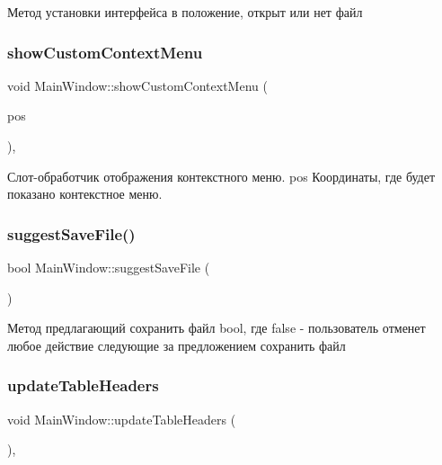 Метод установки интерфейса в положение, открыт или нет файл \mbox{\label{class_main_window_ac9b3f3c02dccbd067c7b614034ffc035}} 
\subsubsection{\texorpdfstring{showCustomContextMenu}{showCustomContextMenu}}
{\footnotesize\ttfamily void Main\+Window\+::show\+Custom\+Context\+Menu (\begin{DoxyParamCaption}\item[{const Q\+Point \&}]{pos }\end{DoxyParamCaption})\hspace{0.3cm}{\ttfamily [private]}, {\ttfamily [slot]}}

Слот-\/обработчик отображения контекстного меню. pos Координаты, где будет показано контекстное меню. \mbox{\label{class_main_window_a0a1b89e3dba62780bfdeea2e76ffc560}} 
\subsubsection{\texorpdfstring{suggestSaveFile()}{suggestSaveFile()}}
{\footnotesize\ttfamily bool Main\+Window\+::suggest\+Save\+File (\begin{DoxyParamCaption}{ }\end{DoxyParamCaption})\hspace{0.3cm}{\ttfamily [private]}}

Метод предлагающий сохранить файл bool, где false -\/ пользователь отменет любое действие следующие за предложением сохранить файл \mbox{\label{class_main_window_ae1afb0606286fe6cb05155b0d120ef17}} 
\subsubsection{\texorpdfstring{updateTableHeaders}{updateTableHeaders}}
{\footnotesize\ttfamily void Main\+Window\+::update\+Table\+Headers (\begin{DoxyParamCaption}{ }\end{DoxyParamCaption})\hspace{0.3cm}{\ttfamily [private]}, {\ttfamily [slot]}}

